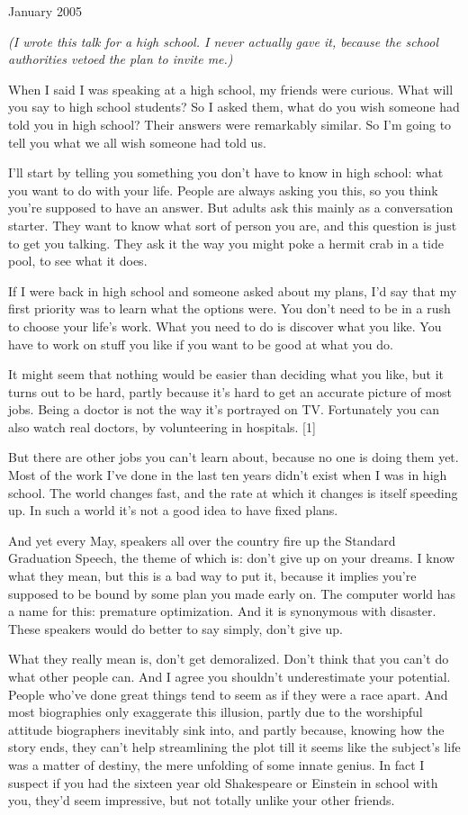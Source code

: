 January 2005

\emph{(I wrote this talk for a high school. I never actually gave it,
because the school authorities vetoed the plan to invite me.)}

When I said I was speaking at a high school, my friends were curious.
What will you say to high school students? So I asked them, what do you
wish someone had told you in high school? Their answers were remarkably
similar. So I'm going to tell you what we all wish someone had told us.

I'll start by telling you something you don't have to know in high
school: what you want to do with your life. People are always asking you
this, so you think you're supposed to have an answer. But adults ask
this mainly as a conversation starter. They want to know what sort of
person you are, and this question is just to get you talking. They ask
it the way you might poke a hermit crab in a tide pool, to see what it
does.

If I were back in high school and someone asked about my plans, I'd say
that my first priority was to learn what the options were. You don't
need to be in a rush to choose your life's work. What you need to do is
discover what you like. You have to work on stuff you like if you want
to be good at what you do.

It might seem that nothing would be easier than deciding what you like,
but it turns out to be hard, partly because it's hard to get an accurate
picture of most jobs. Being a doctor is not the way it's portrayed on
TV. Fortunately you can also watch real doctors, by volunteering in
hospitals. {[}1{]}

But there are other jobs you can't learn about, because no one is doing
them yet. Most of the work I've done in the last ten years didn't exist
when I was in high school. The world changes fast, and the rate at which
it changes is itself speeding up. In such a world it's not a good idea
to have fixed plans.

And yet every May, speakers all over the country fire up the Standard
Graduation Speech, the theme of which is: don't give up on your dreams.
I know what they mean, but this is a bad way to put it, because it
implies you're supposed to be bound by some plan you made early on. The
computer world has a name for this: premature optimization. And it is
synonymous with disaster. These speakers would do better to say simply,
don't give up.

What they really mean is, don't get demoralized. Don't think that you
can't do what other people can. And I agree you shouldn't underestimate
your potential. People who've done great things tend to seem as if they
were a race apart. And most biographies only exaggerate this illusion,
partly due to the worshipful attitude biographers inevitably sink into,
and partly because, knowing how the story ends, they can't help
streamlining the plot till it seems like the subject's life was a matter
of destiny, the mere unfolding of some innate genius. In fact I suspect
if you had the sixteen year old Shakespeare or Einstein in school with
you, they'd seem impressive, but not totally unlike your other friends.

